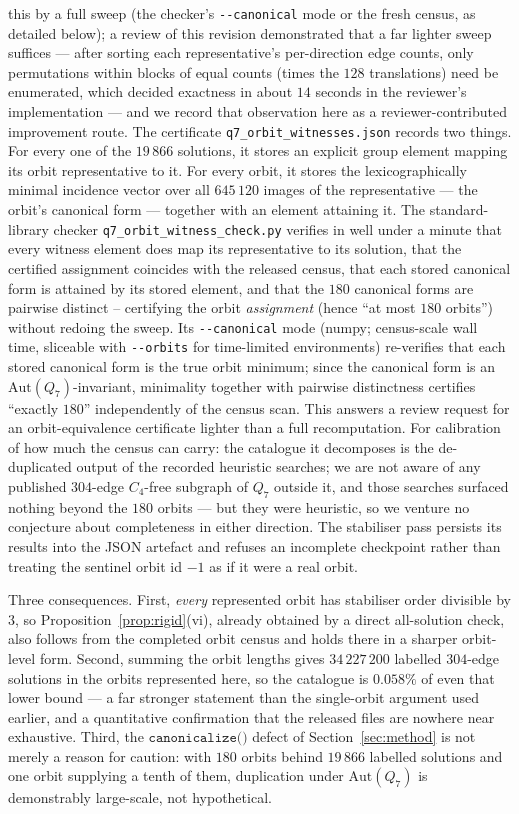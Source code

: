 \documentclass[12pt]{article}
\begin{document}
this by a full sweep (the checker's \texttt{-{}-canonical} mode or the
fresh census, as detailed below); a review of this revision demonstrated
that a far lighter sweep suffices --- after sorting each representative's
per-direction edge counts, only permutations within blocks of equal
counts (times the $128$ translations) need be enumerated, which decided
exactness in about $14$ seconds in the reviewer's implementation --- and
we record that observation here as a reviewer-contributed improvement
route. The certificate \texttt{q7\_orbit\_witnesses.json}
records two things. For every one of the $19\,866$ solutions, it stores
an explicit group element mapping its orbit representative to it. For
every orbit, it stores the lexicographically minimal incidence vector
over all $645\,120$ images of the representative --- the orbit's
canonical form --- together with an element attaining it. The standard-library checker
\texttt{q7\_orbit\_witness\_check.py} verifies in well under a minute
that every witness element does map its representative to its solution,
that the certified assignment coincides with the released census, that
each stored canonical form is attained by its stored element, and that the
$180$ canonical forms are pairwise distinct -- certifying the orbit
\emph{assignment} (hence ``at most $180$ orbits'') without redoing the
sweep. Its \texttt{-{}-canonical} mode (numpy; census-scale wall time,
sliceable with \texttt{-{}-orbits} for time-limited environments)
re-verifies that each stored canonical form is the true orbit minimum;
since the canonical form is an $\mathrm{Aut}(Q_7)$-invariant, minimality
together with pairwise distinctness certifies ``exactly $180$''
independently of the census scan. This answers a review request for an
orbit-equivalence certificate lighter than a full recomputation. For
calibration of how much the census can carry: the catalogue it decomposes
is the de-duplicated output of the recorded heuristic searches; we are
not aware of any published $304$-edge $C_4$-free subgraph of $Q_7$
outside it, and those searches surfaced nothing beyond the $180$ orbits
--- but they were heuristic, so we venture no conjecture about
completeness in either direction. The stabiliser pass
persists its results into the JSON artefact and refuses an incomplete
checkpoint rather than treating the sentinel orbit id $-1$ as if it were a
real orbit.

Three consequences. First, \emph{every} represented orbit has stabiliser order
divisible by $3$, so Proposition~\ref{prop:rigid}(vi), already obtained by a
direct all-solution check, also follows from the completed orbit census and
holds there in a sharper orbit-level form. Second, summing the orbit lengths gives $34\,227\,200$ labelled
$304$-edge solutions in the orbits represented here, so the catalogue is
$0.058\%$ of even that lower bound --- a far stronger statement than the
single-orbit argument used earlier, and a quantitative confirmation that the
released files are nowhere near exhaustive. Third, the $\texttt{canonicalize()}$
defect of Section~\ref{sec:method} is not merely a reason for caution: with
$180$ orbits behind $19\,866$ labelled solutions and one orbit supplying a
tenth of them, duplication under $\mathrm{Aut}(Q_7)$ is demonstrably
large-scale, not hypothetical.
\end{document}
